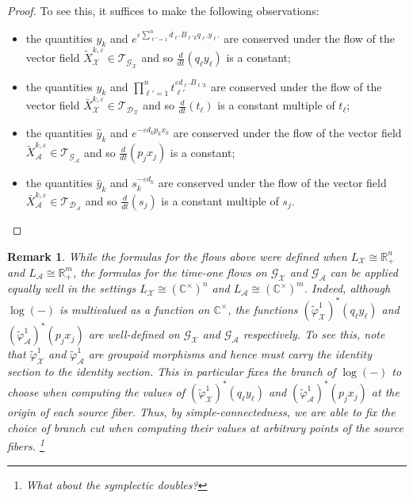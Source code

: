 \documentclass{amsart}
\newtheorem{remark}[theorem]{Remark}
\numberwithin{equation}{section}
\newcommand{\cA}{\mathcal{A}}
\newcommand{\cG}{\mathcal{G}}
\renewcommand{\cD}{\mathcal{D}}
\newcommand{\cX}{\mathcal{X}}
\newcommand{\cT}{\mathcal{T}}
\newcommand{\CC}{\mathbb{C}}
\newcommand{\RR}{\mathbb{R}}
\begin{document}
\begin{proof}
  To see this, it suffices to make the following observations:
  \begin{itemize}
    \item the quantities $y_k$ and $e^{\varepsilon\sum_{\ell'=1}^n d_{\ell'} B_{\ell' k}q_{\ell'} y_{\ell'}}$ are conserved under the flow of the vector field $\tilde X_\cX^{k,\varepsilon}\in\cT_{\cG_\cX}$ and so $\frac{d}{dt}(q_\ell y_\ell)$ is a constant;
    \item the quantities $y_k$ and $\prod_{\ell'=1}^nt_{\ell'}^{\varepsilon d_{\ell'} B_{\ell' k}}$ are conserved under the flow of the vector field $\bar X_\cX^{k,\varepsilon}\in\cT_{\cD_\cX}$ and so $\frac{d}{dt}(t_\ell)$ is a constant multiple of $t_\ell$;
    \item the quantities $\hat y_k$ and $e^{-\varepsilon d_kp_kx_k}$ are conserved under the flow of the vector field $\tilde X_\cA^{k,\varepsilon}\in\cT_{\cG_\cA}$ and so $\frac{d}{dt}(p_jx_j)$ is a constant;
    \item the quantities $\hat y_k$ and $s_k^{-\varepsilon d_k}$ are conserved under the flow of the vector field $\bar X_\cA^{k,\varepsilon}\in\cT_{\cD_\cA}$ and so $\frac{d}{dt}(s_j)$ is a constant multiple of $s_j$.
  \end{itemize}
\end{proof}
\begin{remark}
  While the formulas for the flows above were defined when $L_\cX\cong\RR_+^n$ and $L_\cA\cong\RR_+^m$, the formulas for the time-one flows on $\cG_\cX$ and $\cG_\cA$ can be applied equally well in the settings $L_\cX\cong(\CC^\times)^n$ and $L_\cA\cong(\CC^\times)^m$.
  Indeed, although $\log(-)$ is multivalued as a function on $\CC^\times$, the functions $(\tilde\varphi_\cX^1)^*(q_\ell y_\ell)$ and $(\tilde\varphi_\cA^1)^*(p_jx_j)$ are well-defined on $\cG_\cX$ and $\cG_\cA$ respectively.
  To see this, note that $\tilde\varphi_\cX^1$ and $\tilde\varphi_\cA^1$ are groupoid morphisms and hence must carry the identity section to the identity section.
  This in particular fixes the branch of $\log(-)$ to choose when computing the values of $(\tilde\varphi_\cX^1)^*(q_\ell y_\ell)$ and $(\tilde\varphi_\cA^1)^*(p_jx_j)$ at the origin of each source fiber.
  Thus, by simple-connectedness, we are able to fix the choice of branch cut when computing their values at arbitrary points of the source fibers. 
  \footnote{What about the symplectic doubles?}
\end{remark}
  
\end{document}
